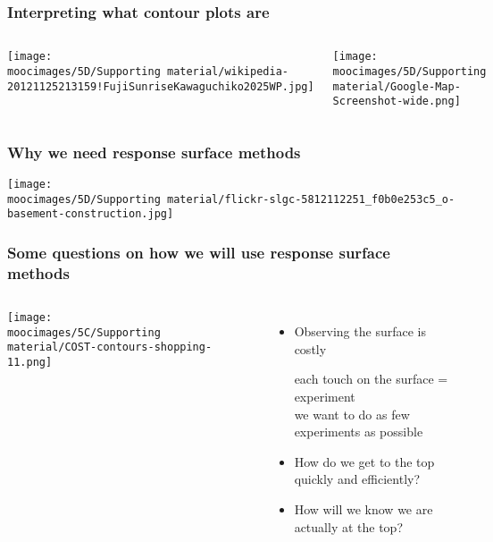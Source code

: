 \documentclass[handout,11pt,aspectratio=169,mathserif]{beamer}
\begin{document}

\begin{frame}\frametitle{Interpreting what contour plots are}
	\begin{columns}[b]
			\centerline{\texttt{[image: \\moocimages/5D/Supporting material/wikipedia-20121125213159!FujiSunriseKawaguchiko2025WP.jpg]}}
			
		
			\centerline{\texttt{[image: \\moocimages/5D/Supporting material/Google-Map-Screenshot-wide.png]}}

	\end{columns}
	
\end{frame}

\begin{frame}\frametitle{Why we need response surface methods}
	\centerline{\texttt{[image: \\moocimages/5D/Supporting material/flickr-slgc-5812112251\_f0b0e253c5\_o-basement-construction.jpg]}}
\end{frame}

\begin{frame}\frametitle{Some questions on how we will use response surface methods }
	\begin{columns}[c]
			\centerline{\texttt{[image: \\moocimages/5C/Supporting material/COST-contours-shopping-11.png]}}

			\begin{itemize}
				\item	Observing the surface is costly
						
						\hspace{1ex} {\scriptsize each touch on the surface = experiment }\\
						\hspace{1ex} {\scriptsize we want to do as few experiments as possible }
				\pause
				\item	How do we get to the top quickly and efficiently?
				
				\pause
				\item	How will we know we are actually at the top?
			\end{itemize}
	\end{columns}
	
\end{frame}
\end{document}

